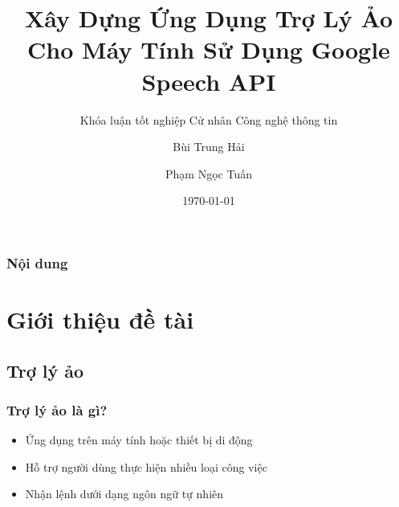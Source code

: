 \documentclass{beamer}
\title[Khóa luận tốt nghiệp]{\textbf{Xây Dựng Ứng Dụng Trợ Lý Ảo Cho Máy Tính Sử Dụng Google Speech API}} %
\subtitle{Khóa luận tốt nghiệp Cử nhân Công nghệ thông tin}
\author{Bùi Trung Hải \and Phạm Ngọc Tuấn} %
\institute[] %
{
GVHD: TS. Ngô Minh Nhựt \\
\medskip
Trường Đại học Khoa học tự nhiên TP. Hồ Chí Minh \\
Khoa Công nghệ thông tin \\
Hệ Cử nhân tài năng
}
\date{\today} %
\begin{document}
\begin{frame}
\titlepage %
\end{frame}

\begin{frame}
\frametitle{Nội dung} %
\tableofcontents %
\end{frame}


\section{Giới thiệu đề tài}

\subsection{Trợ lý ảo}

\begin{frame}
\frametitle{Trợ lý ảo là gì?}
\begin{itemize}
\item Ứng dụng trên máy tính hoặc thiết bị di động
\item Hỗ trợ người dùng thực hiện nhiều loại công việc
\item Nhận lệnh dưới dạng ngôn ngữ tự nhiên
\end{itemize}
\end{frame}
\end{document}
